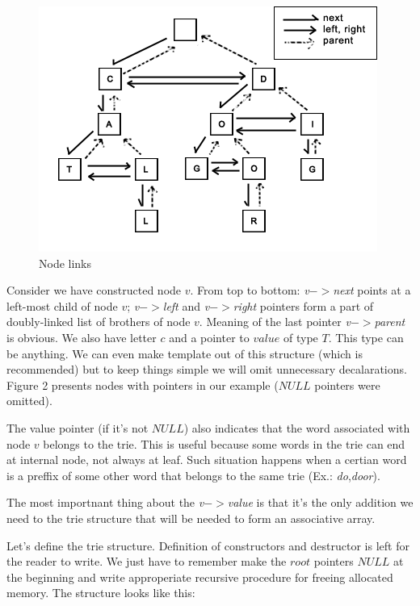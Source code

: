 \documentclass[a4paper,12pt]{article}
\begin{document}
\begin{figure}[ht]
\begin{center}
\includegraphics[scale=0.65,angle=0]{trie2.png}
\caption{Node links}
\end{center}
\end{figure}

Consider we have constructed node $v$. From top to bottom: \emph{v$->$next} points at a left-most child of node $v$; \emph{v$->$left} and \emph{v$->$right} pointers form a part of doubly-linked list of brothers of node $v$. Meaning of the last pointer \emph{v$->$parent} is obvious. We also have letter $c$ and a pointer to $value$ of type $T$. This type can be anything. We can even make template out of this structure (which is recommended) but to keep things simple we will omit unnecessary decalarations. Figure 2 presents nodes with pointers in our example ($NULL$ pointers were omitted).

The value pointer (if it's not $NULL$) also indicates that the word associated with node $v$ belongs to the trie. This is useful because some words in the trie can end at internal node, not always at leaf. Such situation happens when a certian word is a preffix of some other word that belongs to the same trie (Ex.: \emph{do},\emph{door}).

The most importnant thing about the \emph{v$->$value} is that it's the only addition we need to the trie structure that will be needed to form an associative array.

Let's define the trie structure. Definition of constructors and destructor is left for the reader to write. We just have to remember make the $root$ pointers $NULL$ at the beginning and write approperiate recursive procedure for freeing allocated memory. The structure looks like this:
\end{document}
